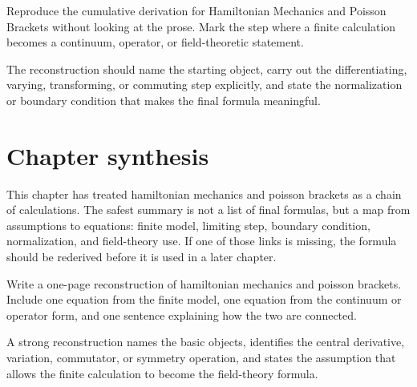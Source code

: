 \begin{exercise}
Reproduce the cumulative derivation for Hamiltonian Mechanics and Poisson Brackets without looking at the prose.  Mark the step where a finite calculation becomes a continuum, operator, or field-theoretic statement.
\begin{answer}
The reconstruction should name the starting object, carry out the differentiating, varying, transforming, or commuting step explicitly, and state the normalization or boundary condition that makes the final formula meaningful.
\end{answer}
\end{exercise}



\section{Chapter synthesis}

This chapter has treated hamiltonian mechanics and poisson brackets as a chain of calculations.  The safest summary is not a list of final formulas, but a map from assumptions to equations: finite model, limiting step, boundary condition, normalization, and field-theory use.  If one of those links is missing, the formula should be rederived before it is used in a later chapter.

\begin{exercise}
Write a one-page reconstruction of hamiltonian mechanics and poisson brackets.  Include one equation from the finite model, one equation from the continuum or operator form, and one sentence explaining how the two are connected.
\begin{answer}
A strong reconstruction names the basic objects, identifies the central derivative, variation, commutator, or symmetry operation, and states the assumption that allows the finite calculation to become the field-theory formula.
\end{answer}
\end{exercise}
